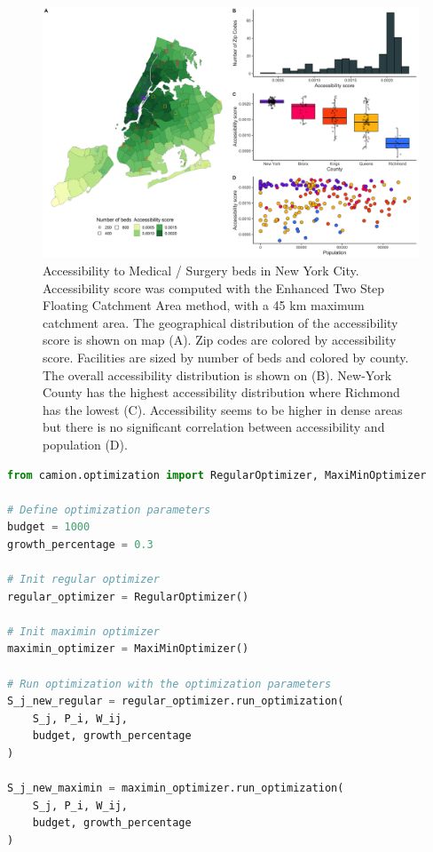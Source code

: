 \begin{figure}[h]
    \includegraphics[width=\textwidth]{images/camion-ny/fig2.png}
    \centering
    \caption{
        Accessibility to Medical / Surgery beds in New York City. Accessibility score was computed with the Enhanced Two Step Floating Catchment Area method, with a 45 km maximum catchment area. The geographical distribution of the accessibility score is shown on map (A). Zip codes are colored by accessibility score. Facilities are sized by number of beds and colored by county. The overall accessibility distribution is shown on (B). New-York County has the highest accessibility distribution where Richmond has the lowest (C). Accessibility seems to be higher in dense areas but there is no significant correlation between accessibility and population (D).
    }
    \label{fig:camion-ny-accessibility}
\end{figure}

\begin{lstlisting}[language=Python, caption=Optimize accessibility with \acs{camion}]
from camion.optimization import RegularOptimizer, MaxiMinOptimizer

# Define optimization parameters
budget = 1000
growth_percentage = 0.3

# Init regular optimizer
regular_optimizer = RegularOptimizer()

# Init maximin optimizer
maximin_optimizer = MaxiMinOptimizer()

# Run optimization with the optimization parameters
S_j_new_regular = regular_optimizer.run_optimization(
    S_j, P_i, W_ij,
    budget, growth_percentage
)

S_j_new_maximin = maximin_optimizer.run_optimization(
    S_j, P_i, W_ij,
    budget, growth_percentage
)
\end{lstlisting}

